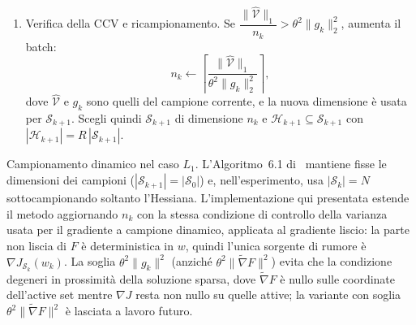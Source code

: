 \documentclass[a4paper,12pt]{article}
\numberwithin{equation}{section}
\numberwithin{figure}{section}
\numberwithin{table}{section}
\begin{document}
\begin{actionbox}
\begin{enumerate}
    \item Verifica della CCV e ricampionamento.
    Se $\dfrac{\|\widehat{\mathcal{V}}\|_1}{n_k} > \theta^2 \|g_k\|_2^2$, aumenta il batch:
    \[
    n_k \leftarrow \left\lceil \frac{\|\widehat{\mathcal{V}}\|_1}{\theta^2 \|g_k\|_2^2} \right\rceil ,
    \]
    dove $\widehat{\mathcal{V}}$ e $g_k$ sono quelli del campione corrente, e la
    nuova dimensione è usata per $\mathcal{S}_{k+1}$. Scegli quindi
    $\mathcal{S}_{k+1}$ di dimensione $n_k$ e
    $\mathcal{H}_{k+1} \subseteq \mathcal{S}_{k+1}$ con
    $|\mathcal{H}_{k+1}| = R\,|\mathcal{S}_{k+1}|$.
  \end{enumerate}
\end{actionbox}

\begin{notebox}
  Campionamento dinamico nel caso $L_1$. L'Algoritmo~6.1 di~\cite{byrd2012}
  mantiene fisse le dimensioni dei campioni ($|\mathcal{S}_{k+1}|=|\mathcal{S}_0|$)
  e, nell'esperimento, usa $|\mathcal{S}_k|=N$ sottocampionando soltanto
  l'Hessiana. L'implementazione qui presentata estende il metodo aggiornando
  $n_k$ con la stessa condizione di controllo della varianza usata per il
  gradiente a campione dinamico, applicata al gradiente liscio: la parte non
  liscia di $F$ è deterministica in $w$, quindi l'unica sorgente di rumore è
  $\nabla J_{\mathcal{S}_k}(w_k)$. La soglia $\theta^2\|g_k\|^2$ (anziché
  $\theta^2\|\widetilde{\nabla}F\|^2$) evita che la condizione degeneri in
  prossimità della soluzione sparsa, dove $\widetilde{\nabla}F$ è nullo sulle
  coordinate dell'active set mentre $\nabla J$ resta non nullo su quelle attive;
  la variante con soglia $\theta^2\|\widetilde{\nabla}F\|^2$ è lasciata a lavoro
  futuro.
\end{notebox}
\end{document}
